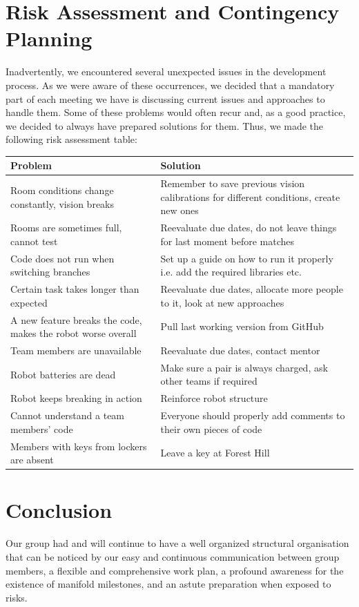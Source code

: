 \documentclass[12pt,oneside]{article}
\begin{document}
	\section{Risk Assessment and Contingency Planning}
		Inadvertently, we encountered several unexpected issues in the development process. As we were aware of these occurrences, we decided that a mandatory part of each meeting we have is discussing current issues and approaches to handle them. Some of these problems would often recur and, as a good practice, we decided to always have prepared solutions for them. Thus, we made the following risk assessment table:
		\begin{center}
			\begin{tabular}{|p{7cm}|p{7cm}|} 
				\hline
				Problem & Solution \\ [0.5ex] 
				\hline\hline
				Room conditions change constantly, vision breaks & Remember to save previous vision calibrations for different conditions, create new ones\\ 
				\hline
				Rooms are sometimes full, cannot test & Reevaluate due dates, do not leave things for last moment before matches\\
				\hline
				Code does not run when switching branches & Set up a guide on how to run it properly i.e. add the required libraries etc. \\
				\hline
				Certain task takes longer than expected & Reevaluate due dates, allocate more people to it, look at new approaches\\
				\hline
				A new feature breaks the code, makes the robot worse overall & Pull last working version from GitHub\\
				\hline
				Team members are unavailable & Reevaluate due dates, contact mentor\\
				\hline
				Robot batteries are dead & Make sure a pair is always charged, ask other teams if required\\
				\hline
				Robot keeps breaking in action & Reinforce robot structure\\
				\hline
				Cannot understand a team members' code & Everyone should properly add comments to their own pieces of code\\
				\hline
				Members with keys from lockers are absent & Leave a key at Forest Hill\\ [1ex] 
				\hline
			\end{tabular}
		\end{center}
	\section{Conclusion}
		Our group had and will continue to have a well organized structural organisation that can be noticed by our easy and continuous communication between group members, a flexible and comprehensive work plan, a profound awareness for the existence of manifold milestones, and an astute preparation when exposed to risks.	
\end{document}
